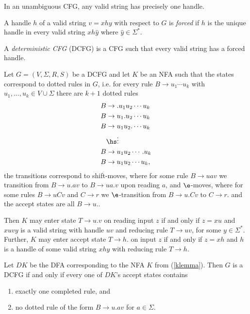 \documentclass{article}
\begin{document}
\begin{lemma}[Sipser p. 137]
    In an unambiguous CFG, any valid string has precisely one handle.
\end{lemma}

\begin{definition}
    A handle $h$ of a valid string $v=xhy$ with respect to $G$ is \emph{forced} if $h$ is 
    the unique handle in every valid string $xh\hat y$ where $\hat y\in\Sigma^*$.
\end{definition}

\begin{definition}
    A \emph{deterministic CFG} (DCFG) is a CFG such that every valid string has a forced handle.
\end{definition}

\begin{lemma}[Sipser p. 140]
    \label{klemma}
    Let $G=(V,\Sigma,R,S)$ be a DCFG and let $K$ be an NFA such that the states correspond to 
    dotted rules in $G$, i.e. for every rule $B\to u_1\cdots u_k$ with $u_1,...,u_k\in V\cup\Sigma$
    there are $k+1$ dotted rules
    \begin{align*}
        B&\to .u_1u_2\cdots u_k\\
        B&\to u_1.u_2\cdots u_k\\
        B&\to u_1u_2.\cdots u_k\\
        &\hs\vdots\\
        B&\to u_1u_2\cdots .u_k\\
        B&\to u_1u_2\cdots u_k,
    \end{align*}
    the transitions correspond to shift-moves, where for some rule $B\to uav$ we transition from 
    $B\to u.av$ to $B\to ua.v$ upon reading $a$, and $\e$-moves, where for some rules 
    $B\to uCv$ and $C\to r$ we $\e$-transition from $B\to u.Cv$ to $C\to r.$ and the accept states 
    are all $B\to u.$.

    Then $K$ may enter state $T\to u.v$ on reading input $z$ if and only if $z=xu$ and 
    $xuvy$ is a valid string with handle $uv$ and reducing rule $T\to uv$, for some $y\in\Sigma^*$.
    Further, $K$ may enter accept state $T\to h.$ on input $z$ if and only if $z=xh$ and $h$ is a 
    handle of some valid string $xhy$ with reducing rule $T\to h$.
\end{lemma}

\begin{theorem}
    Let $DK$ be the DFA corresponding to the NFA $K$ from (\ref{klemma}). Then $G$ is a 
    DCFG if and only if every one of $DK$'s accept states contains
    \begin{enumerate}
        \item exactly one completed rule, and 
        \item no dotted rule of the form $B\to u.av$ for $a\in\Sigma$.
    \end{enumerate}
\end{theorem}
\end{document}

